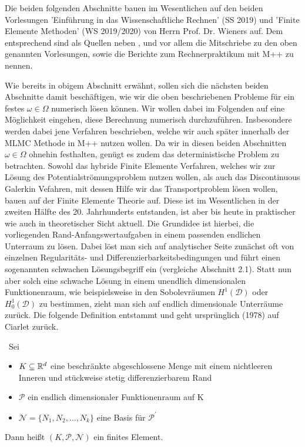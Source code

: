 \label{num_pot}
\begin{Bemerkung}
	Die beiden folgenden Abschnitte bauen im Wesentlichen auf den beiden Vorlesungen 'Einführung in das Wissenschaftliche Rechnen' (SS 2019) und 'Finite Elemente Methoden' (WS 2019/2020) von Herrn Prof. Dr. Wieners auf. Dem entsprechend sind als Quellen neben \cite{brenner2007mathematical},
	\cite{braess2013finite} und \cite{hanke2002grundlagen} vor allem die Mitschriebe zu den oben genannten Vorlesungen, sowie die Berichte zum Rechnerpraktikum mit M++ \cite{siteM++} zu nennen.
\end{Bemerkung}
Wie bereits in obigem Abschnitt erwähnt, sollen sich die nächsten beiden Abschnitte damit beschäftigen, wie wir die oben beschriebenen Probleme für ein festes $\omega \in \Omega$ numerisch lösen können. 
Wir wollen dabei im Folgenden auf eine Möglichkeit eingehen, diese Berechnung numerisch durchzuführen. Insbesondere werden dabei jene Verfahren beschrieben, welche wir auch später innerhalb der MLMC Methode in M++ nutzen wollen.
Da wir in diesen beiden Abschnitten $\omega \in \Omega$ ohnehin festhalten, genügt es zudem das deterministische Problem zu betrachten. \newline
Sowohl das hybride Finite Elemente Verfahren, welches wir zur Lösung des Potentialströmungsproblem nutzen wollen, als auch das Discontinuous Galerkin Vefahren, mit dessen Hilfe wir das Transportproblem lösen wollen, bauen auf der Finite Elemente Theorie auf. 
Diese ist im Wesentlichen in der zweiten Hälfte des 20. Jahrhunderts entstanden, ist aber bis heute in praktischer wie auch in theoretischer Sicht aktuell.
Die Grundidee ist hierbei, die vorliegenden Rand-Anfangswertaufgaben in einem passenden endlichen Unterraum zu lösen. Dabei löst man sich auf analytischer Seite zunächst oft von einzelnen Regularitäts- und Differenzierbarkeitsbedingungen und führt einen sogenannten schwachen Lösungsbegriff ein (vergleiche Abschnitt 2.1). Statt nun aber solch eine schwache Lösung in einem unendlich dimensionalen Funktionenraum, wie beispielsweise in den Sobolevräumen $H^1(\mathcal{D})$ oder $H_0^1(\mathcal{D})$ zu bestimmen, zieht man sich auf endlich dimensionale Unterräume zurück. \newline
Die folgende Definition entstammt \cite{brenner2007mathematical} und geht ursprünglich (1978) auf Ciarlet zurück.
\begin{Definition}\
	Sei
	\begin{itemize}
		\item $K \subseteq \mathbb{R}^d$ eine beschränkte abgeschlossene Menge mit einem nichtleeren Inneren und stückweise stetig differenzierbarem Rand 
		\item $\mathcal{P}$ ein endlich dimensionaler Funktionenraum auf K
		\item $\mathcal{N} = \{N_1,N_2,\dots,N_k \}$ eine Basis für $\mathcal{P}^{'}$
	\end{itemize}
	Dann heißt $(K,\mathcal{P},\mathcal{N})$ ein finites Element.
\end{Definition}

